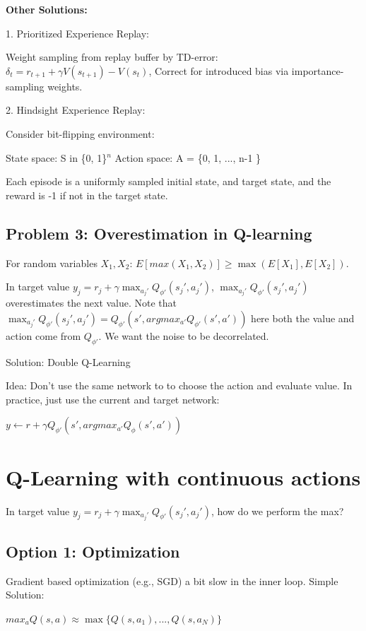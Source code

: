 \documentclass{article}
\begin{document}
\textbf{Other Solutions:}

1. Prioritized Experience Replay:

Weight sampling from replay buffer by TD-error: $\delta_t = r_{t+1} + \gamma V(s_{t+1}) - V(s_t)$, Correct for introduced bias via importance-sampling weights.

2. Hindsight Experience Replay:

Consider bit-flipping environment:

State space: S in \{0, 1\}$^n$
  Action space: A = \{0, 1, ..., n-1 \}

Each episode is a uniformly sampled initial state, and target state, and the reward is -1 if not in the target state.

\subsection{Problem 3: Overestimation in Q-learning}
For random variables $X_1, X_2$:
$E[max(X_1, X_2)] \geq \max(E[X_1], E[X_2])$.

In target value $y_j = r_j + \gamma \max_{a_j'} Q_{\phi'}(s_j', a_j')$, $\max_{a_j'} Q_{\phi'}(s_j', a_j')$ overestimates the next value. Note that $\max_{a_j'} Q_{\phi'}(s_j', a_j')= Q_{\phi'}(s', argmax_{a'}Q_{\phi'}(s', a'))$ here both the value and action come from $Q_{\phi'}$. We want the noise to be decorrelated. 

Solution: Double Q-Learning

Idea: Don't use the same network to to choose the action and evaluate value. In practice, just use the current and target network:

$y \leftarrow r+ \gamma Q_{\phi'}(s', argmax_{a'}Q_{\phi}(s', a'))$



\section{Q-Learning with continuous actions}
In target value $y_j = r_j + \gamma \max_{a_j'} Q_{\phi'}(s_j', a_j')$, how do we perform the max?

\subsection{Option 1: Optimization}
Gradient based optimization (e.g., SGD) a bit slow in the inner loop.
Simple Solution:

$max_a Q(s, a) \approx \max\{ Q(s,a_1), ..., Q(s, a_N)\}$
\end{document}
